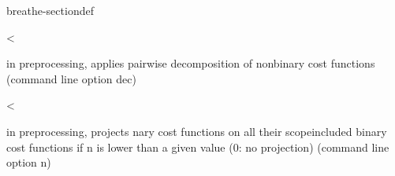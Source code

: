 \documentclass[letterpaper,10pt,openany,oneside,english]{sphinxmanual}
\begin{document}
\begin{fulllineitems}
\begin{sphinxuseclass}{breathe-sectiondef}
\begin{fulllineitems}
\label{\detokenize{ref/ref_cpp:_CPPv4N8ToulBar214preprocessNaryE}}\label{\detokenize{ref/ref_cpp:_CPPv3N8ToulBar214preprocessNaryE}}\label{\detokenize{ref/ref_cpp:_CPPv2N8ToulBar214preprocessNaryE}}\label{\detokenize{ref/ref_cpp:ToulBar2::preprocessNary__i}}
\pysigstartsignatures
\pysigstartmultiline
{}
\pysigstopmultiline
\pysigstopsignatures
\sphinxAtStartPar
\textless{} 

\sphinxAtStartPar
in preprocessing, applies pairwise decomposition of non\sphinxhyphen{}binary cost functions (command line option \sphinxhyphen{}dec) 

\end{fulllineitems}


\begin{fulllineitems}
\label{\detokenize{ref/ref_cpp:_CPPv4N8ToulBar215QueueComplexityE}}\label{\detokenize{ref/ref_cpp:_CPPv3N8ToulBar215QueueComplexityE}}\label{\detokenize{ref/ref_cpp:_CPPv2N8ToulBar215QueueComplexityE}}\label{\detokenize{ref/ref_cpp:ToulBar2::QueueComplexity__b}}
\pysigstartsignatures
\pysigstartmultiline
{}
\pysigstopmultiline
\pysigstopsignatures
\sphinxAtStartPar
\textless{} 

\sphinxAtStartPar
in preprocessing, projects n\sphinxhyphen{}ary cost functions on all their scope\sphinxhyphen{}included binary cost functions if n is lower than a given value (0: no projection) (command line option \sphinxhyphen{}n) 

\end{fulllineitems}



\end{sphinxuseclass}
\end{fulllineitems}
\end{document}

